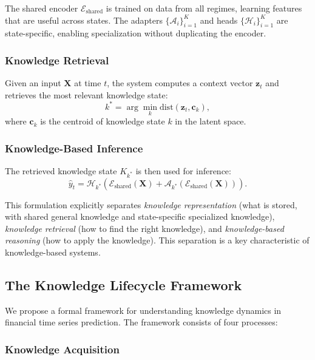 \documentclass[review]{elsarticle}
\begin{document}
The shared encoder $\mathcal{E}_{\text{shared}}$ is trained on data from all regimes, learning features that are useful across states. The adapters $\{\mathcal{A}_i\}_{i=1}^K$ and heads $\{\mathcal{H}_i\}_{i=1}^K$ are state-specific, enabling specialization without duplicating the encoder.

\subsubsection{Knowledge Retrieval}

Given an input $\mathbf{X}$ at time $t$, the system computes a context vector $\mathbf{z}_t$ and retrieves the most relevant knowledge state:
\begin{equation}
k^* = \arg\min_k \text{dist}(\mathbf{z}_t, \mathbf{c}_k),
\end{equation}
where $\mathbf{c}_k$ is the centroid of knowledge state $k$ in the latent space.

\subsubsection{Knowledge-Based Inference}

The retrieved knowledge state $K_{k^*}$ is then used for inference:
\begin{equation}
\hat{y}_t = \mathcal{H}_{k^*}(\mathcal{E}_{\text{shared}}(\mathbf{X}) + \mathcal{A}_{k^*}(\mathcal{E}_{\text{shared}}(\mathbf{X}))).
\end{equation}

This formulation explicitly separates \textit{knowledge representation} (what is stored, with shared general knowledge and state-specific specialized knowledge), \textit{knowledge retrieval} (how to find the right knowledge), and \textit{knowledge-based reasoning} (how to apply the knowledge). This separation is a key characteristic of knowledge-based systems.

\subsection{The Knowledge Lifecycle Framework}

We propose a formal framework for understanding knowledge dynamics in financial time series prediction. The framework consists of four processes:

\subsubsection{Knowledge Acquisition}
\end{document}
